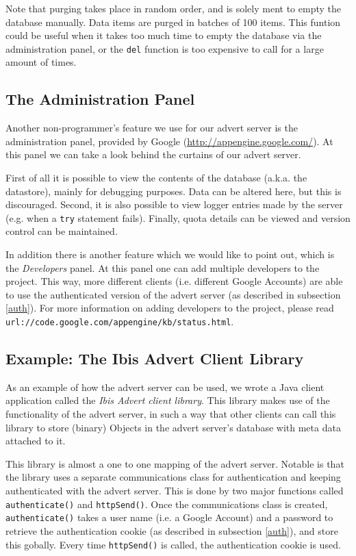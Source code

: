 Note that purging takes place in random order, and is solely ment to empty the
database manually. Data items are purged in batches of 100 items. This funtion 
could be useful when it takes too much time to empty the database via the
administration panel, or the \texttt{del} function is too expensive to call for
a large amount of times.

\subsection{The Administration Panel}
\label{admin-panel}
Another non-programmer's feature we use for our advert server is the
administration panel, provided by Google (\url{http://appengine.google.com/}).
At this panel we can take a look behind the curtains of our advert server.

First of all it is possible to view the contents of the database (a.k.a. the
datastore), mainly for debugging purposes. Data can be altered here, but this
is discouraged. Second, it is also possible to view logger entries made by the
server (e.g. when a \texttt{try} statement fails). Finally, quota details can
be viewed and version control can be maintained.

In addition there is another feature which we would like to point out, which is
the \emph{Developers} panel. At this panel one can add multiple developers to
the project. This way, more different clients (i.e. different Google Accounts)
are able to use the authenticated version of the advert server (as described in
subsection \ref{auth}). For more information on adding developers to the project,
please read \texttt{url://code.google.com/appengine/kb/status.html}.

\subsection{Example: The Ibis Advert Client Library}
\label{advert-lib}
As an example of how the advert server can be used, we wrote a Java client
application called the \emph{Ibis Advert client library}. This library makes use
of the functionality of the advert server, in such a way that other clients can
call this library to store (binary) Objects in the advert server's database
with meta data attached to it.

This library is almost a one to one mapping of the advert server. Notable is
that the library uses a separate communications class for authentication and
keeping authenticated with the advert server. This is done by two major
functions called \texttt{authenticate()} and \texttt{httpSend()}. Once the
communications class is created,  \texttt{authenticate()} takes a user name
(i.e. a Google Account) and a password to retrieve the authentication cookie
(as described in subsection \ref{auth}), and store this gobally. Every time
\texttt{httpSend()} is called, the authentication cookie is used.

